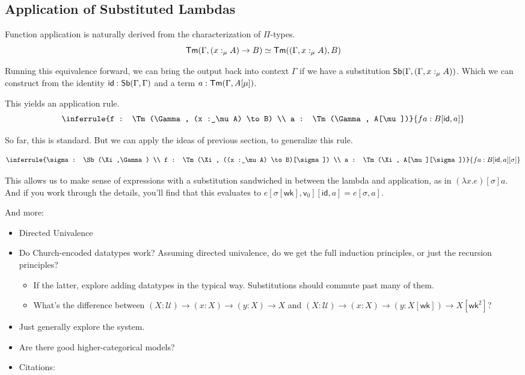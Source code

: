 \documentclass{article}
\begin{document}
\subsection{Application of Substituted Lambdas}

Function application is naturally derived from the characterization of \(\Pi\)-types.
\[\mathsf{Tm}(\Gamma, (x :_\mu A) \to B) \simeq \mathsf{Tm}((\Gamma, x :_\mu A), B)\]

Running this equivalence forward, we can bring the output back into context \(\Gamma\)
if we have a substitution \(\mathsf{Sb}(\Gamma, (\Gamma, x :_\mu A))\).
Which we can construct from the identity \(\mathsf{id} : \mathsf{Sb}(\Gamma,\Gamma)\)
and a term \(a : \mathsf{Tm}(\Gamma, A[\mu])\).

This yields an application rule.
\[\inferrule{f : \Tm(\Gamma, (x :_\mu A) \to B) \\ a : \Tm(\Gamma, A[\mu])}{f a : B[\mathsf{id}, a]}\]

So far, this is standard. But we can apply the ideas of previous section, to generalize this rule.

\[\inferrule{\sigma : \Sb(\Xi,\Gamma) \\ f : \Tm(\Xi, ((x :_\mu A) \to B)[\sigma]) \\ a : \Tm(\Xi, A[\mu][\sigma])}{f a : B[\mathsf{id}, a][\sigma]}\]

This allows us to make sense of expressions with a substitution sandwiched in between the lambda and application,
as in \((\lambda x. e)[\sigma] a\).
And if you work through the details, you'll find that this evaluates to \(e[\sigma[\mathsf{wk}],\mathsf{v}_0][\mathsf{id}, a] = e[\sigma, a]\).

\pagebreak

\listoftodos

\noindent And more:

\begin{itemize}
    \item Directed Univalence
    \item Do Church-encoded datatypes work? Assuming directed univalence, do we get the full induction principles, or just the recursion principles?
    \begin{itemize}
        \item If the latter, explore adding datatypes in the typical way. Substitutions should commute past many of them.
        \item What's the difference between \((X : \mathcal{U}) \to (x : X) \to (y : X) \to X\)
        and \((X : \mathcal{U}) \to (x : X) \to (y : X[\mathsf{wk}]) \to X[\mathsf{wk}^2]\)?
    \end{itemize}
    \item Just generally explore the system.
    \item Are there good higher-categorical models?
    \item Citations:
\end{itemize}

\printbibliography
\end{document}
